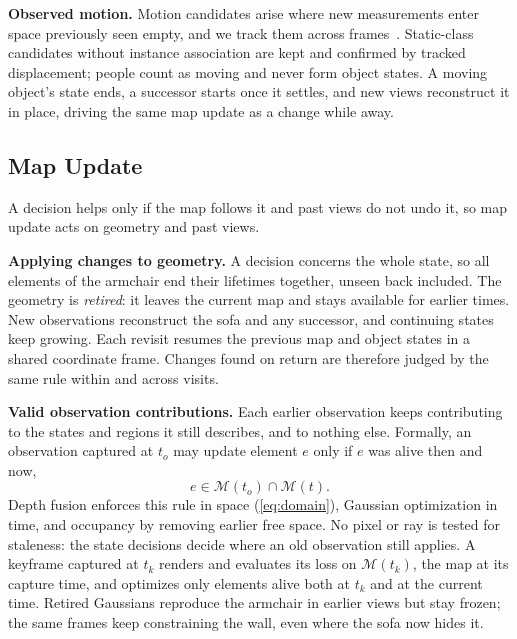 \documentclass[10pt,twocolumn,letterpaper]{article}
\begin{document}
\vspace{0mm}\noindent\textbf{Observed motion.}
Motion candidates arise where new measurements enter space previously seen empty, and we track them across
frames~\cite{10218983,Schmid-RSS-24}. Static-class candidates without
instance association are kept and confirmed by tracked displacement; people count as moving and never form object states. A
moving object's state ends, a successor starts once it settles, and new views reconstruct it in place, driving the same map update as a change while away.

\subsection{Map Update}
\label{sec:validity}

A decision helps only if the map follows it and past views do not undo it, so map
update acts on geometry and past views.

\vspace{0mm}\noindent\textbf{Applying changes to geometry.}
A decision concerns the whole state, so all elements of the armchair end their lifetimes together, unseen back
included. The geometry is \emph{retired}: it leaves the current map and stays available for earlier times. New
observations reconstruct the sofa and any successor, and continuing states keep growing.
Each revisit resumes the previous map and object states in a shared coordinate frame. Changes found on
return are therefore judged by the same rule within and across visits.

\vspace{0mm}\noindent\textbf{Valid observation contributions.}
Each earlier observation keeps contributing to the states and regions it still describes, and to nothing else. Formally, an observation captured at $t_o$ may update element $e$ only if $e$ was alive then and now,
\begin{equation}
  e\in\mathcal{M}(t_o)\cap\mathcal{M}(t).
  \label{eq:valid}
\end{equation}
Depth fusion enforces this rule in space (\cref{eq:domain}), Gaussian optimization in time, and occupancy by removing earlier free space. No pixel or ray is tested for staleness: the state decisions decide where an old observation still applies.
A keyframe captured at $t_k$ renders and evaluates its loss on $\mathcal{M}(t_k)$, the map at its capture time, and optimizes
only elements alive both at $t_k$ and at the current time. Retired Gaussians reproduce the armchair in earlier views but stay frozen; the same frames keep constraining the wall, even where the sofa now hides it.
\end{document}
